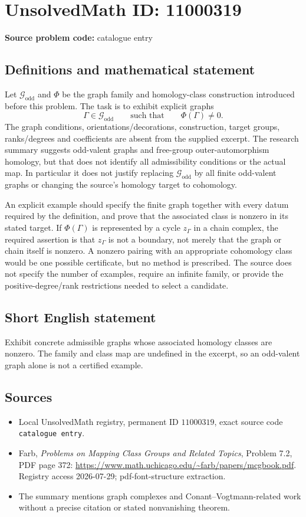 \documentclass[11pt]{article}
\begin{document}
\section*{UnsolvedMath ID: 11000319}
\textbf{Source problem code:} catalogue entry
\subsection{Definitions and mathematical statement}
Let \(\mathcal G_{\mathrm{odd}}\) and \(\Phi\) be the graph family and homology-class construction introduced before this problem. The task is to exhibit explicit graphs
\[\Gamma\in\mathcal G_{\mathrm{odd}}\qquad\text{such that}\qquad\Phi(\Gamma)\ne0.\]
The graph conditions, orientations/decorations, construction, target groups, ranks/degrees and coefficients are absent from the supplied excerpt. The research summary suggests odd-valent graphs and free-group outer-automorphism homology, but that does not identify all admissibility conditions or the actual map. In particular it does not justify replacing \(\mathcal G_{\mathrm{odd}}\) by all finite odd-valent graphs or changing the source's homology target to cohomology.

An explicit example should specify the finite graph together with every datum required by the definition, and prove that the associated class is nonzero in its stated target. If \(\Phi(\Gamma)\) is represented by a cycle \(z_\Gamma\) in a chain complex, the required assertion is that \(z_\Gamma\) is not a boundary, not merely that the graph or chain itself is nonzero. A nonzero pairing with an appropriate cohomology class would be one possible certificate, but no method is prescribed. The source does not specify the number of examples, require an infinite family, or provide the positive-degree/rank restrictions needed to select a candidate.
\subsection{Short English statement}
Exhibit concrete admissible graphs whose associated homology classes are nonzero. The family and class map are undefined in the excerpt, so an odd-valent graph alone is not a certified example.
\subsection{Sources}
\begin{itemize}
\item Local UnsolvedMath registry, permanent ID \(11000319\), exact source code \texttt{catalogue entry}.
\item Farb, \emph{Problems on Mapping Class Groups and Related Topics}, Problem 7.2, PDF page 372: \url{https://www.math.uchicago.edu/~farb/papers/mcgbook.pdf}. Registry access 2026-07-29; pdf-font-structure extraction.
\item The summary mentions graph complexes and Conant--Vogtmann-related work without a precise citation or stated nonvanishing theorem.
\end{itemize}
\end{document}
